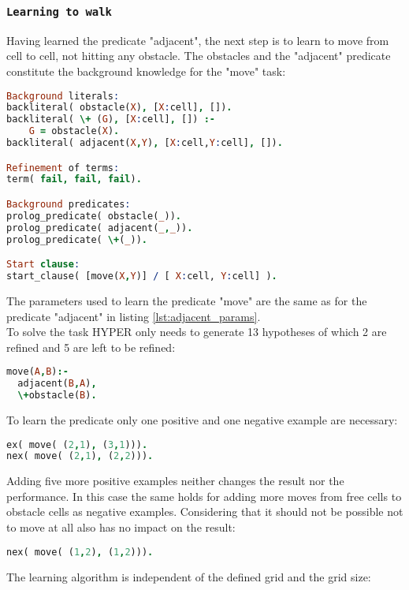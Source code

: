 \subsubsection{\texttt{Learning to walk}}
Having learned the predicate "adjacent", the next step is to learn to move from cell to cell, not hitting any obstacle.
The obstacles and the "adjacent" predicate constitute the background knowledge for the "move" task:
\begin{lstlisting}[label={lst:move}, language=Prolog, caption=Learning the predicate "move", belowcaptionskip=1cm]
Background literals:
backliteral( obstacle(X), [X:cell], []).
backliteral( \+ (G), [X:cell], []) :-
	G = obstacle(X).
backliteral( adjacent(X,Y), [X:cell,Y:cell], []). 

Refinement of terms:
term( fail, fail, fail).

Background predicates:
prolog_predicate( obstacle(_)).
prolog_predicate( adjacent(_,_)).
prolog_predicate( \+(_)).       

Start clause:
start_clause( [move(X,Y)] / [ X:cell, Y:cell] ).
\end{lstlisting}
The parameters used to learn the predicate "move" are the same as for the predicate "adjacent" in listing \ref{lst:adjacent_params}.\\
To solve the task HYPER only needs to generate 13 hypotheses of which 2 are refined and 5 are left to be refined:
\begin{lstlisting}[label={lst:move_res}, language=Prolog, caption= Predicate "move", belowcaptionskip=1cm]
move(A,B):-
  adjacent(B,A),
  \+obstacle(B).
\end{lstlisting}
To learn the predicate only one positive and one negative example are necessary:
\begin{lstlisting}[label={lst:move_examples}, language=Prolog, caption= Examples to learn "move", belowcaptionskip=1cm]
ex( move( (2,1), (3,1))).
nex( move( (2,1), (2,2))).
\end{lstlisting}
Adding five more positive examples neither changes the result nor the performance.
In this case the same holds for adding more moves from free cells to obstacle cells as negative examples.
Considering that it should not be possible not to move at all also has no impact on the result:
\begin{lstlisting}[label={lst:move_neg}, language=Prolog, caption= Additional negative example for "move", belowcaptionskip=1cm]
nex( move( (1,2), (1,2))).
\end{lstlisting}
The learning algorithm is independent of the defined grid and the grid size:
